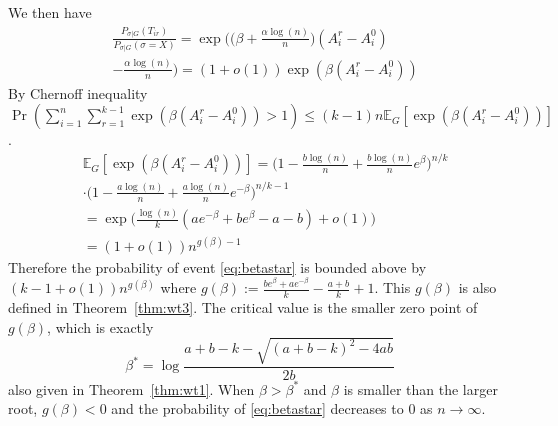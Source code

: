 \documentclass[conference]{IEEEtran}
\begin{document}
	We then have
	\begin{align}
	&\frac{P_{\sigma|G}(T_{ir})}
	{P_{\sigma|G}(\sigma=X)}
	= \exp\Big(\big(\beta+\frac{\alpha\log(n)}{n} \big) (A^r_i-A^0_i) \nonumber\\
	&-\frac{\alpha\log(n)}{n} \Big) 
	= (1+o(1)) \exp ( \beta(A^r_i-A^0_i))
	\end{align}
	By Chernoff inequality $ \Pr(\sum_{i=1}^n\sum_{r=1}^{k-1}\exp ( \beta(A^r_i-A^0_i)) > 1) \leq (k-1)n\mathbb{E}_G[\exp (\beta (A^r_i-A^0_i))] $.
	\begin{align}
	&\mathbb{E}_G[\exp (\beta (A^r_i-A^0_i))]
	=\Big(1-\frac{b\log(n)}{n}+\frac{b\log(n)}{n} e^{\beta} \Big)^{n/k} \nonumber \\
	&\cdot \Big(1-\frac{a\log(n)}{n}+\frac{a\log(n)}{n} e^{-\beta} \Big)^{n/k-1}\nonumber\\
	& = 
	\exp\Big(\frac{\log(n)}{k} ( a e^{-\beta}+b e^{\beta} -a-b )
	+o(1) \Big)\nonumber \\
	& = (1+o(1)) n^{g(\beta)-1} \label{eq:gbetaminus1}
	\end{align}
	Therefore the probability of event \eqref{eq:betastar} is bounded above by $ (k-1 + o(1)) n^{g(\beta)}$
	where $g(\beta)  := \frac{b e^{\beta}+a e^{-\beta}}{k}-\frac{a+b}{k}+1$. This $g(\beta)$ is also defined in Theorem~\ref{thm:wt3}.
	The critical value is the smaller zero point of $g(\beta)$, which is exactly
	$$
	\beta^* = \log\frac{a+b-k-\sqrt{(a+b-k)^2-4ab}}{2 b}
	$$
	also given in Theorem~\ref{thm:wt1}.
	When $\beta > \beta^*$ and $\beta$ is smaller than the larger root, $g(\beta) < 0$ and the probability of \eqref{eq:betastar} decreases to
	$0$ as $n\to \infty$.
	
\end{document}
